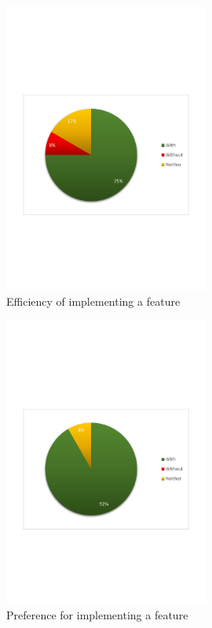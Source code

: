 \begin{figure}[H]
  \centering
    \includegraphics[width=0.6\textwidth]{images/charts/implementing_efficient.pdf}
	\caption{Efficiency of implementing a feature}
	\label{fig:implementing_efficient}
\end{figure}

\begin{figure}[H]
  \centering
    \includegraphics[width=0.6\textwidth]{images/charts/prefer_implementing.pdf}
	\caption{Preference for implementing a feature}
	\label{fig:prefer_implementing}
\end{figure}

